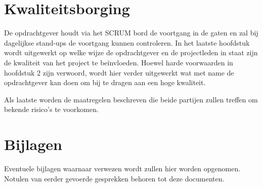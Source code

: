 \section{Kwaliteitsborging}
De opdrachtgever houdt via het SCRUM bord de voortgang in de gaten en zal bij dagelijkse stand-ups de voortgang kunnen controleren.  In het laatste hoofdstuk wordt uitgewerkt op welke wijze de opdrachtgever en de projectleden in staat zijn de kwaliteit van het project te beïnvloeden. Hoewel harde voorwaarden in hoofdstuk 2 zijn verwoord, wordt hier verder uitgewerkt wat met name de opdrachtgever kan doen om bij te dragen aan een hoge kwaliteit.

Als laatste worden de maatregelen beschreven die beide partijen zullen treffen om bekende risico’s te voorkomen.

\section{Bijlagen}

Eventuele bijlagen waarnaar verwezen wordt zullen hier worden opgenomen. Notulen van eerder gevoerde gesprekken behoren tot deze documenten.